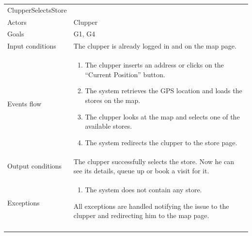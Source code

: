 \begin{longtable}[]{@{}
  >{\raggedright\arraybackslash}p{}
  >{\raggedright\arraybackslash}p{}@{}}
\toprule
ClupperSelectsStore & \\ \addlinespace
\midrule
\endhead
Actors & Clupper \\ \addlinespace
Goals & G1, G4 \\ \addlinespace
Input conditions & The clupper is already logged in and on the map page. \\ \addlinespace
Events flow & \begin{enumerate}\vspace{-1.35\baselineskip}
    \item The clupper inserts an address or clicks on the ``Current Position'' button.
    \item The system retrieves the GPS location and loads the stores on the map.
    \item The clupper looks at the map and selects one of the available stores.
    \item The system redirects the clupper to the store page. 
\vspace{-1.0\baselineskip}\end{enumerate}\\ \addlinespace
Output conditions & The clupper successfully selects the store. Now he can see its details, queue up or book a visit for it. \\ \addlinespace
Exceptions & \begin{enumerate}\vspace{-1.35\baselineskip}
    \item The system does not contain any store.
\end{enumerate} All exceptions are handled notifying the issue to the clupper and redirecting him to the map page. \\ \addlinespace
\bottomrule
\end{longtable}

